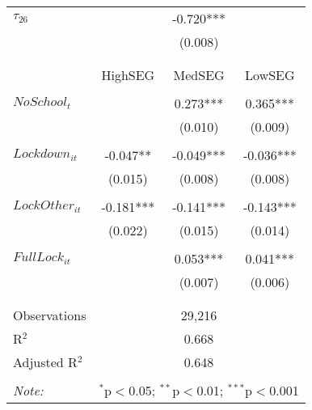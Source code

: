 \begin{tabular}{@{\extracolsep{-2pt}}lccc}
$\tau_{26}$ &      & -0.720*** &            \\
            &      &  (0.008)  &            \\
            &      &           &            \\[-2.1ex]
\cline{2-4} \\ [-1ex]      
                    &   HighSEG &    MedSEG &   LowSEG  \\\\[-.7ex]  
$NoSchool_t$        &           &  0.273*** &  0.365*** \\
                    &           &   (0.010) &   (0.009) \\
                    &           &           &           \\[-2.1ex]
$Lockdown_{it}$     & -0.047**  & -0.049*** & -0.036*** \\
                    &  (0.015)  &  (0.008)  &  (0.008)  \\
                    &           &           &           \\[-2.1ex]
$LockOther_{it}$    & -0.181*** & -0.141*** & -0.143*** \\
                    &  (0.022)  &  (0.015)  &  (0.014)  \\
                    &           &           &           \\[-2.1ex]
$FullLock_{it}$     &           &  0.053*** &  0.041*** \\
                    &           &   (0.007) &   (0.006) \\
                    &           &           &           \\[-2.1ex]
\hline \\[-1.8ex] 
Observations     & \multicolumn{3}{c}{29,216}  \\ 
R$^{2}$          & \multicolumn{3}{c}{ 0.668}  \\ 
Adjusted R$^{2}$ & \multicolumn{3}{c}{ 0.648}  \\ 
\hline 
\hline \\[-1.8ex] 
\textit{Note:}  & \multicolumn{3}{r}{$^{*}$p$<$0.05; $^{**}$p$<$0.01; $^{***}$p$<$0.001} \\ 
\end{tabular} 


% 
